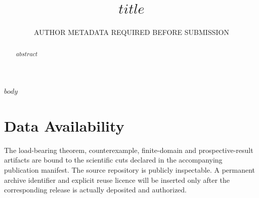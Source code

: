 \documentclass[aps,prx,twocolumn,superscriptaddress]{revtex4-2}
\begin{document}
\title{$title$}
\author{AUTHOR METADATA REQUIRED BEFORE SUBMISSION}
\date{}
\begin{abstract}
$abstract$
\end{abstract}
\maketitle

$body$

\section*{Data Availability}
The load-bearing theorem, counterexample, finite-domain and prospective-result artifacts are
bound to the scientific cuts declared in the accompanying publication manifest. The source
repository is publicly inspectable. A permanent archive identifier and explicit reuse licence
will be inserted only after the corresponding release is actually deposited and authorized.



\end{document}
